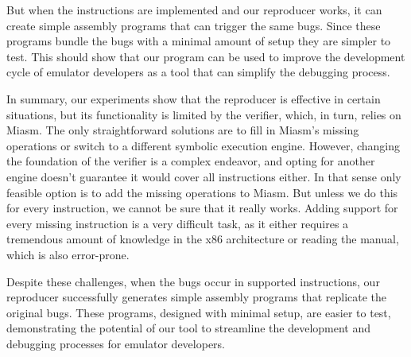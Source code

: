 But when the instructions are implemented and our reproducer works, it can create simple assembly programs that can trigger the same bugs.
Since these programs bundle the bugs with a minimal amount of setup they are simpler to test.
This should show that our program can be used to improve the development cycle of emulator developers as a tool that can simplify the debugging process.


In summary, our experiments show that the reproducer is effective in certain situations, but its functionality is limited by the verifier, which, in turn, relies on Miasm.
The only straightforward solutions are to fill in Miasm's missing operations or switch to a different symbolic execution engine.
However, changing the foundation of the verifier is a complex endeavor, and opting for another engine doesn't guarantee it would cover all instructions either.
In that sense only feasible option is to add the missing operations to Miasm.
But unless we do this for every instruction, we cannot be sure that it really works.
Adding support for every missing instruction is a very difficult task, as it either requires a tremendous amount of knowledge in the x86 architecture or reading the manual, which is also error-prone. 

Despite these challenges, when the bugs occur in supported instructions, our reproducer successfully generates simple assembly programs that replicate the original bugs.
These programs, designed with minimal setup, are easier to test, demonstrating the potential of our tool to streamline the development and debugging processes for emulator developers.
